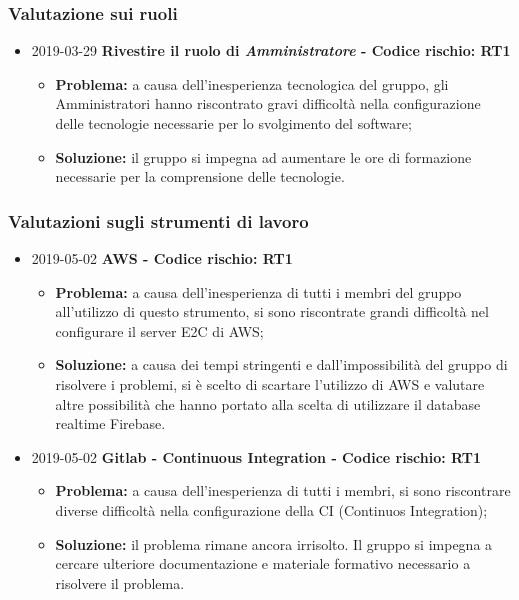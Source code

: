 \subsubsection{Valutazione sui ruoli}

\begin{itemize}
\item 2019-03-29 \textbf{Rivestire il ruolo di \textit{Amministratore} - Codice rischio: RT1} \\
		\begin{itemize}
			\item \textbf{Problema:} a causa dell'inesperienza tecnologica del gruppo, gli Amministratori hanno riscontrato gravi difficoltà nella configurazione delle tecnologie necessarie per lo svolgimento del software;
			\item \textbf{Soluzione:} il gruppo si impegna ad aumentare le ore di formazione necessarie per la comprensione delle tecnologie.
		\end{itemize}	
		
		
\end{itemize}
\subsubsection{Valutazioni sugli strumenti di lavoro}
\begin{itemize}
				
		\item 2019-05-02 \textbf{AWS - Codice rischio: RT1} \\
		\begin{itemize}
			\item \textbf{Problema:} a causa dell'inesperienza di tutti i membri del gruppo all'utilizzo di questo strumento, si sono riscontrate grandi difficoltà nel configurare il server E2C di AWS;
			\item \textbf{Soluzione:} a causa dei tempi stringenti e dall'impossibilità del gruppo di risolvere i problemi, si è scelto di scartare l'utilizzo di AWS e valutare altre possibilità che hanno portato alla scelta di utilizzare il database realtime Firebase.
		\end{itemize}		
		\item 2019-05-02 \textbf{Gitlab - Continuous Integration - Codice rischio: RT1} \\
		\begin{itemize}
			\item \textbf{Problema:} a causa dell'inesperienza di tutti i membri, si sono riscontrare diverse difficoltà nella configurazione della CI (Continuos Integration\glo);
			\item \textbf{Soluzione:} il problema rimane ancora irrisolto. Il gruppo si impegna a cercare ulteriore documentazione e materiale formativo necessario a risolvere il problema.
		\end{itemize}
\end{itemize}